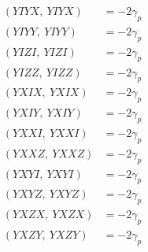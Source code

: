 \documentclass{article}
\begin{document}
\begin{align*}
  (YIYX,\ YIYX) &= - 2 \gamma_{p} \\
  (YIYY,\ YIYY) &= - 2 \gamma_{p} \\
  (YIZI,\ YIZI) &= - 2 \gamma_{p} \\
  (YIZZ,\ YIZZ) &= - 2 \gamma_{p} \\
  (YXIX,\ YXIX) &= - 2 \gamma_{p} \\
  (YXIY,\ YXIY) &= - 2 \gamma_{p} \\
  (YXXI,\ YXXI) &= - 2 \gamma_{p} \\
  (YXXZ,\ YXXZ) &= - 2 \gamma_{p} \\
  (YXYI,\ YXYI) &= - 2 \gamma_{p} \\
  (YXYZ,\ YXYZ) &= - 2 \gamma_{p} \\
  (YXZX,\ YXZX) &= - 2 \gamma_{p} \\
  (YXZY,\ YXZY) &= - 2 \gamma_{p}
\end{align*}
\end{document}

